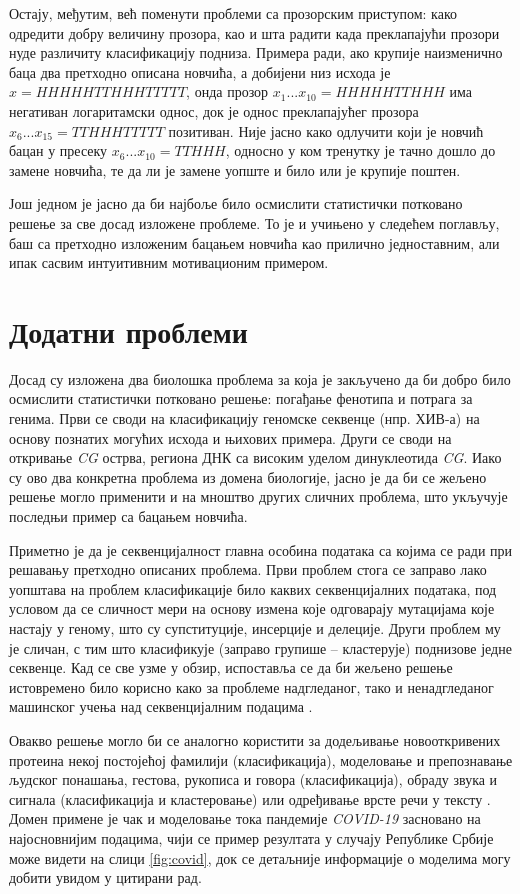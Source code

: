 \documentclass[12pt,oneside]{memoir}
\begin{document}
\begin{CJK}{UTF8}{ipxm}
Остају, међутим, већ поменути проблеми са прозорским приступом: како одредити добру величину прозора, као и шта радити када преклапајући прозори нуде различиту класификацију подниза. Примера ради, ако крупије наизменично баца два претходно описана новчића, а добијени низ исхода је $x = HHHHHTTHHHTTTTT$, онда прозор $x_1...x_{10} = HHHHHTTHHH$ има негативан логаритамски однос, док је однос преклапајућег прозора $x_6...x_{15} = TTHHHTTTTT$ позитиван. Није јасно како одлучити који је новчић бацан у пресеку $x_6...x_{10} = TTHHH$, односно у ком тренутку је тачно дошло до замене новчића, те да ли је замене уопште и било или је крупије поштен.

Још једном је јасно да би најбоље било осмислити статистички потковано решење за све досад изложене проблеме. То је и учињено у следећем поглављу, баш са претходно изложеним бацањем новчића као прилично једноставним, али ипак сасвим интуитивним мотивационим примером.

\section{Додатни проблеми}
Досад су изложена два биолошка проблема за која је закључено да би добро било осмислити статистички потковано решење: погађање фенотипа и потрага за генима. Први се своди на класификацију геномске секвенце (нпр. ХИВ-а) на основу познатих могућих исхода и њихових примера. Други се своди на откривање \textit{CG} острва, региона ДНК са високим уделом динуклеотида \textit{CG}. Иако су ово два конкретна проблема из домена биологије, јасно је да би се жељено решење могло применити и на мноштво других сличних проблема, што укључује последњи пример са бацањем новчића.

Приметно је да је секвенцијалност главна особина података са којима се ради при решавању претходно описаних проблема. Први проблем стога се заправо лако уопштава на проблем класификације било каквих секвенцијалних података, под условом да се сличност мери на основу измена које одговарају мутацијама које настају у геному, што су супституције, инсерције и делеције. Други проблем му је сличан, с тим што класификује (заправо групише -- кластерује) поднизове једне секвенце. Кад се све узме у обзир, испоставља се да би жељено решење истовремено било корисно како за проблеме надгледаног, тако и ненадгледаног машинског учења над секвенцијалним подацима \cite{khoda2014}.

Овакво решење могло би се аналогно користити за додељивање новооткривених протеина некој постојећој фамилији \cite{nguyen2016} (класификација), моделовање и препознавање људског понашања, гестова, рукописа и говора \cite{gales2007} (класификација), обраду звука и сигнала \cite{andreao2006} (класификација и кластеровање) или одређивање врсте речи у тексту \cite{mutjaba2020}. Домен примене је чак и моделовање тока пандемије \textit{COVID-19} засновано на најосновнијим подацима, чији се пример резултата у случају Републике Србије може видети на слици \ref{fig:covid}, док се детаљније информације о моделима могу добити увидом у цитирани рад.


\end{CJK}
\end{document}
